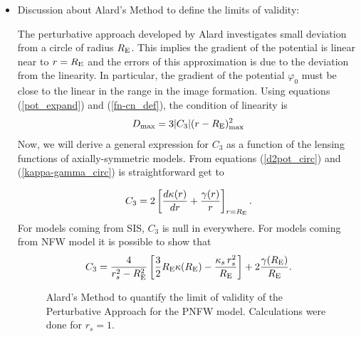 \documentclass[useAMS,usenatbib]{mn2e}
\begin{document}
\begin{itemize}
\item Discussion about Alard's Method to define the limits of validity:

The perturbative approach developed by Alard investigates small deviation from a circle of radius $R_{\rm E}$. This implies the gradient of the potential is linear near to $r=R_{\rm E}$ and the errors of this approximation is due to the deviation from the linearity. In particular, the gradient of the potential $\varphi_0$ must be close to the linear in the range in the image formation. Using equations (\ref{pot_expand}) and (\ref{fn-cn_def}), the condition of linearity is
\begin{equation}
D_{\rm max}=3|C_3|(r-R_{\rm E})_{\rm max}^2
\end{equation}
Now, we will derive a general expression for $C_3$ as a function of the lensing functions of axially-symmetric models. From equations (\ref{d2pot_circ}) and (\ref{kappa-gamma_circ})  is straightforward get to

\begin{equation}
C_3=2\left[\frac{d\kappa(r)}{dr}+\frac{\gamma(r)}{r}\right]_{r=R_{\rm E}}.
\end{equation}
For models coming from SIS, $C_3$ is null in everywhere. For models coming from NFW model it is possible to show that
\begin{equation}
C_3=\frac{4}{r^2_s-R^2_{\rm E}}\left[\frac{3}{2}R_{\rm E}\kappa(R_{\rm E})-\frac{\kappa_s\,r^2_s}{R_{\rm E}} \right]+2\frac{\gamma(R_{\rm E})}{R_{\rm E}}.
\end{equation}


\begin{figure}
\begin{center}
\caption{\label{dmax_plot} Alard's Method to quantify the limit of validity of the Perturbative Approach for the PNFW model. Calculations were done for $r_ s=1$. }
\end{center}
\end{figure}




\end{itemize}
\end{document}
